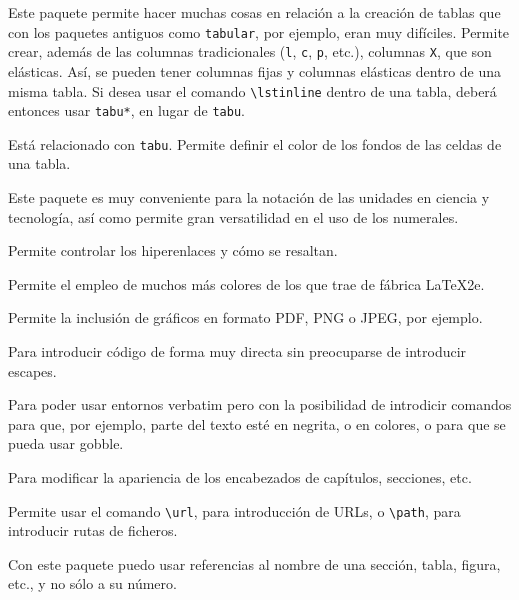 \begin{desc-package}

  \item[tabu] Este paquete permite hacer muchas cosas en relación a la creación de tablas que con los paquetes
    antiguos como \lstinline!tabular!, por ejemplo, eran muy difíciles. Permite crear, además de las columnas
    tradicionales (\lstinline+l+, \lstinline+c+, \lstinline+p+, etc.), columnas \lstinline+X+, que son
    elásticas. Así, se pueden tener columnas fijas y columnas elásticas dentro de una misma tabla. Si desea usar
    el comando \lstinline+\lstinline+ dentro de una tabla, deberá entonces usar \lstinline+tabu*+, en lugar de
    \lstinline+tabu+.

  \item[colortbl] Está relacionado con \lstinline+tabu+. Permite definir el color de los fondos de las celdas de
    una tabla.

  \item[siunitx] Este paquete es muy conveniente para la notación de las unidades en ciencia y tecnología, así
    como permite gran versatilidad en el uso de los numerales.

  \item[hyperref] Permite controlar los hiperenlaces y cómo se resaltan.

  \item[xcolor] Permite el empleo de muchos más colores de los que trae de fábrica \LaTeX{}2e.

  \item[graphicx] Permite la inclusión de gráficos en formato PDF, PNG o JPEG, por ejemplo.

  \item[verbatim] Para introducir código de forma muy directa sin preocuparse de introducir escapes.

  \item[fancyvrb] Para poder usar entornos verbatim pero con la posibilidad de introdicir comandos para que, por
    ejemplo, parte del texto esté en negrita, o en colores, o para que se pueda usar gobble.

  \item[titlesec] Para modificar la apariencia de los encabezados de capítulos, secciones, etc.

  \item[url] Permite usar el comando \lstinline+\url+, para introducción de URLs, o \lstinline+\path+, para
    introducir rutas de ficheros.

  \item[nameref] Con este paquete puedo usar referencias al nombre de una sección, tabla, figura, etc., y no
    sólo a su número.


\end{desc-package}
